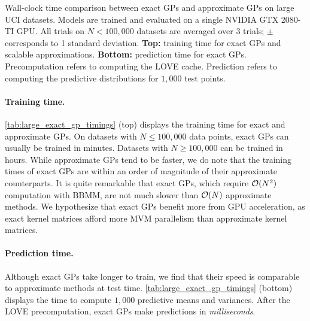 
\begin{table}[t!]
  \vspace{1em}
  \caption[Wall-clock time comparison between exact GPs and approximate GPs on large UCI datasets.]{
    Wall-clock time comparison between exact GPs and approximate GPs on large UCI datasets.
    Models are trained and evaluated on a single NVIDIA GTX 2080-TI GPU.
    All trials on $N < 100,\!000$ datasets are averaged over 3 trials; $\pm$ corresponds to 1 standard deviation.
    {\bf Top:} training time for exact GPs and scalable approximations.
    {\bf Bottom:} prediction time for exact GPs.
    Precomputation refers to computing the LOVE cache.
    Prediction refers to computing the predictive distributions for $1,\!000$ test points.
  }
  \label{tab:large_exact_gp_timings}
  \centering
  \vspace{1em}

  \resizebox{\textwidth}{!}{%
    
  }
  \vspace{1em}

  \resizebox{\textwidth}{!}{%
    
  }

  \vspace{2em}
\end{table}


\paragraph{Training time.}
\cref{tab:large_exact_gp_timings} (top) displays the training time for exact and approximate GPs.
On datasets with $N \leq 100,\!000$ data points, exact GPs can usually be trained in minutes.
Datasets with $N \geq 100,\!000$ can be trained in hours.
While approximate GPs tend to be faster, we do note that the training times of exact GPs are within an order of magnitude of their approximate counterparts.
It is quite remarkable that exact GPs, which require $\bigo{N^2}$ computation with BBMM, are not much slower than $\bigo{N}$ approximate methods.
We hypothesize that exact GPs benefit more from GPU acceleration, as exact kernel matrices afford more MVM parallelism than approximate kernel matrices.

\paragraph{Prediction time.}
Although exact GPs take longer to train, we find that their speed is comparable to approximate methods at test time.
\cref{tab:large_exact_gp_timings} (bottom) displays the time to compute $1,\!000$ predictive means and variances.
After the LOVE precomputation, exact GPs make predictions in \emph{milliseconds}.

